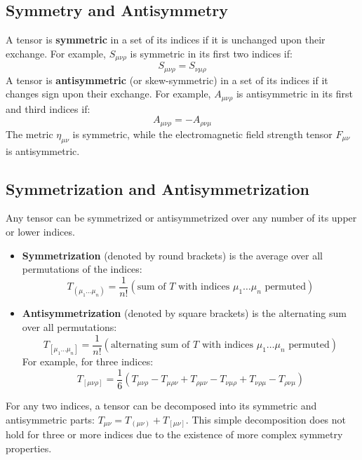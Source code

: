 \documentclass[11pt, a4paper]{report}
\begin{document}
\subsection*{Symmetry and Antisymmetry}

A tensor is \textbf{symmetric} in a set of its indices if it is unchanged upon their exchange. For example, $S_{\mu\nu\rho}$ is symmetric in its first two indices if:
\begin{equation}
    S_{\mu\nu\rho} = S_{\nu\mu\rho}
\end{equation}
A tensor is \textbf{antisymmetric} (or skew-symmetric) in a set of its indices if it changes sign upon their exchange. For example, $A_{\mu\nu\rho}$ is antisymmetric in its first and third indices if:
\begin{equation}
    A_{\mu\nu\rho} = -A_{\rho\nu\mu}
\end{equation}
The metric $\eta_{\mu\nu}$ is symmetric, while the electromagnetic field strength tensor $F_{\mu\nu}$ is antisymmetric.

\subsection*{Symmetrization and Antisymmetrization}

Any tensor can be symmetrized or antisymmetrized over any number of its upper or lower indices.
\begin{itemize}
    \item \textbf{Symmetrization} (denoted by round brackets) is the average over all permutations of the indices:
    \begin{equation}
        T_{(\mu_1 \dots \mu_n)} = \frac{1}{n!} (\text{sum of } T \text{ with indices } \mu_1 \dots \mu_n \text{ permuted})
    \end{equation}
    \item \textbf{Antisymmetrization} (denoted by square brackets) is the alternating sum over all permutations:
    \begin{equation}
        T_{[\mu_1 \dots \mu_n]} = \frac{1}{n!} (\text{alternating sum of } T \text{ with indices } \mu_1 \dots \mu_n \text{ permuted})
    \end{equation}
    For example, for three indices:
    \begin{equation}
        T_{[\mu\nu\rho]} = \frac{1}{6}(T_{\mu\nu\rho} - T_{\mu\rho\nu} + T_{\rho\mu\nu} - T_{\nu\mu\rho} + T_{\nu\rho\mu} - T_{\rho\nu\mu})
    \end{equation}
\end{itemize}
For any two indices, a tensor can be decomposed into its symmetric and antisymmetric parts: $T_{\mu\nu} = T_{(\mu\nu)} + T_{[\mu\nu]}$. This simple decomposition does not hold for three or more indices due to the existence of more complex symmetry properties.
\end{document}

